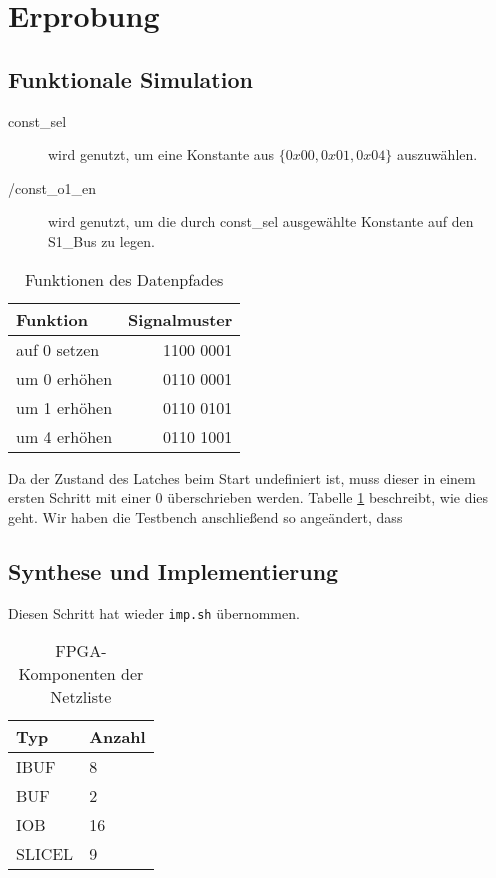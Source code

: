 \documentclass[12pt,a4paper]{scrartcl}
\begin{document}
\section{Erprobung}

\subsection{Funktionale Simulation}
\begin{description}
\item [const\_sel] wird genutzt, um eine Konstante aus $\{0x00, 0x01, 0x04\}$ auszuw\"ahlen.
\item [/const\_o1\_en] wird genutzt, um die durch const\_sel ausgew\"ahlte Konstante auf den S1\_Bus zu legen.
\end{description}


\begin{table}[h]
    \centering
    \begin{tabular}{l|r}
    \hline
    Funktion       & Signalmuster \\
    \hline
    auf 0 setzen   & 1100 0001 \\
    um 0 erh\"ohen & 0110 0001 \\
    um 1 erh\"ohen & 0110 0101 \\
    um 4 erh\"ohen & 0110 1001 \\
    \hline
    \end{tabular}
    \caption{Funktionen des Datenpfades}
    \label{funktion}
\end{table}


Da der Zustand des Latches beim Start undefiniert ist, muss dieser in einem ersten Schritt mit einer 0 \"uberschrieben werden.
Tabelle \ref{funktion} beschreibt, wie dies geht.
Wir haben die Testbench anschlie\ss end so ange\"andert, dass

\subsection{Synthese und Implementierung}
Diesen Schritt hat wieder \texttt{imp.sh} \"ubernommen.

\begin{table}[h]
    \centering
    \begin{tabular}{l|l}
    \hline
    Typ     & Anzahl  \\
    \hline
    IBUF    & 8       \\ %
    BUF     & 2       \\ %
    IOB     & 16      \\ %
    SLICEL  & 9       \\
    \hline
    \end{tabular}
    \caption{FPGA-Komponenten der Netzliste}
    \label{netzliste}
\end{table}
\end{document}

